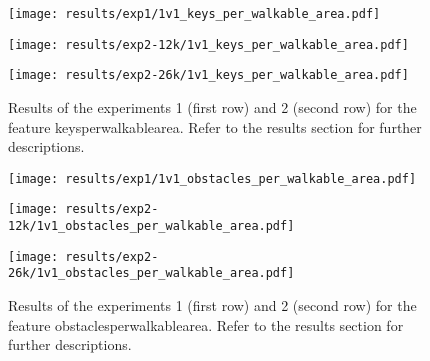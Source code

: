 \begin{figure}[h!]
    \centering
	\begin{minipage}{0.3\linewidth}
		\texttt{[image: results/exp1/1v1\_keys\_per\_walkable\_area.pdf]}
	\end{minipage}

	\begin{minipage}{0.3\linewidth}
		\texttt{[image: results/exp2-12k/1v1\_keys\_per\_walkable\_area.pdf]}
	\end{minipage}
	\begin{minipage}{0.3\linewidth}
		\texttt{[image: results/exp2-26k/1v1\_keys\_per\_walkable\_area.pdf]}
	\end{minipage}

	\caption[ Results: Feature keys\textunderscore per\textunderscore walkable\textunderscore area]{ Results of the experiments 1 (first row) and 2 (second row) for the feature keys\textunderscore per\textunderscore walkable\textunderscore area. Refer to the results section for further descriptions. }
	\label{fig:appendix_keys_per_walkable_area}
\end{figure}
 \newpage 

 
\begin{figure}[h!]
    \centering
	\begin{minipage}{0.3\linewidth}
		\texttt{[image: results/exp1/1v1\_obstacles\_per\_walkable\_area.pdf]}
	\end{minipage}

	\begin{minipage}{0.3\linewidth}
		\texttt{[image: results/exp2-12k/1v1\_obstacles\_per\_walkable\_area.pdf]}
	\end{minipage}
	\begin{minipage}{0.3\linewidth}
		\texttt{[image: results/exp2-26k/1v1\_obstacles\_per\_walkable\_area.pdf]}
	\end{minipage}

	\caption[ Results: Feature obstacles\textunderscore per\textunderscore walkable\textunderscore area]{ Results of the experiments 1 (first row) and 2 (second row) for the feature obstacles\textunderscore per\textunderscore walkable\textunderscore area. Refer to the results section for further descriptions. }
	\label{fig:appendix_obstacles_per_walkable_area}
\end{figure}
 
